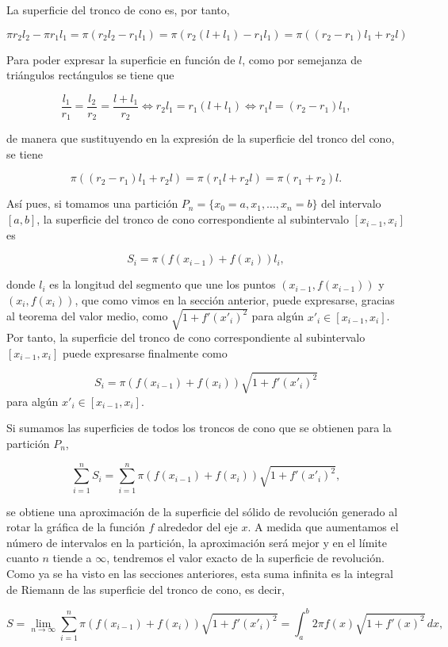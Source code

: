 \documentclass[
  a4paper,
]{scrreport}
\theoremstyle{definition}
\theoremstyle{plain}
\theoremstyle{definition}
\theoremstyle{definition}
\theoremstyle{plain}
\theoremstyle{plain}
\theoremstyle{remark}
\begin{document}
La superficie del tronco de cono es, por tanto,

\[
\pi r_2 l_2 - \pi r_1 l_1 = \pi (r_2l_2-r_1l_1) = \pi(r_2(l+l_1)-r_1l_1) = \pi ((r_2-r_1)l_1+r_2l)
\]

Para poder expresar la superficie en función de \(l\), como por
semejanza de triángulos rectángulos se tiene que

\[
\frac{l_1}{r_1}=\frac{l_2}{r_2}=\frac{l+l_1}{r_2} \Leftrightarrow r_2l_1 = r_1(l+l_1) \Leftrightarrow r_1l = (r_2-r_1)l_1,
\]

de manera que sustituyendo en la expresión de la superficie del tronco
del cono, se tiene

\[
\pi ((r_2-r_1)l_1+r_2l) =  \pi (r_1l+r_2l) = \pi (r_1+r_2) l.
\]

Así pues, si tomamos una partición \(P_n=\{x_0=a, x_1, \ldots, x_n=b\}\)
del intervalo \([a,b]\), la superficie del tronco de cono
correspondiente al subintervalo \([x_{i-1},x_i]\) es

\[ 
S_i = \pi (f(x_{i-1})+f(x_i))l_i,
\]

donde \(l_i\) es la longitud del segmento que une los puntos
\((x_{i-1},f(x_{i-1}))\) y \((x_i,f(x_i))\), que como vimos en la
sección anterior, puede expresarse, gracias al teorema del valor medio,
como \(\sqrt{1+f'(x'_i)^2}\) para algún \(x'_i \in [x_{i-1},x_i]\). Por
tanto, la superficie del tronco de cono correspondiente al subintervalo
\([x_{i-1},x_i]\) puede expresarse finalmente como

\[
S_i = \pi (f(x_{i-1})+f(x_i))\sqrt{1+f'(x'_i)^2}
\] para algún \(x'_i\in [x_{i-1},x_i]\).

Si sumamos las superficies de todos los troncos de cono que se obtienen
para la partición \(P_n\),

\[
\sum_{i=1}^n S_i = \sum_{i=1}^n \pi (f(x_{i-1})+f(x_i))\sqrt{1+f'(x'_i)^2},
\]

se obtiene una aproximación de la superficie del sólido de revolución
generado al rotar la gráfica de la función \(f\) alrededor del eje
\(x\). A medida que aumentamos el número de intervalos en la partición,
la aproximación será mejor y en el límite cuanto \(n\) tiende a
\(\infty\), tendremos el valor exacto de la superficie de revolución.
Como ya se ha visto en las secciones anteriores, esta suma infinita es
la integral de Riemann de las superficie del tronco de cono, es decir,

\[
S = \lim_{n\to\infty} \sum_{i=1}^n \pi (f(x_{i-1})+f(x_i))\sqrt{1+f'(x'_i)^2} = \int_a^b 2 \pi f(x)\sqrt{1+f'(x)^2}\,dx,
\]
\end{document}
